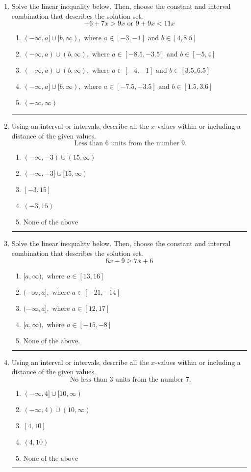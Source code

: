 \documentclass[14pt]{extbook}
\newcommand{\litem}[1]{\item#1\hspace*{-1cm}\rule{\textwidth}{0.4pt}}
\begin{document}
\begin{enumerate}
\litem{
Solve the linear inequality below. Then, choose the constant and interval combination that describes the solution set.\[ -6 + 7 x > 9 x \text{ or } 9 + 9 x < 11 x \]\begin{enumerate}[label=\Alph*.]
\item \( (-\infty, a] \cup [b, \infty), \text{ where } a \in [-3, -1] \text{ and } b \in [4, 8.5] \)
\item \( (-\infty, a) \cup (b, \infty), \text{ where } a \in [-8.5, -3.5] \text{ and } b \in [-5, 4] \)
\item \( (-\infty, a) \cup (b, \infty), \text{ where } a \in [-4, -1] \text{ and } b \in [3.5, 6.5] \)
\item \( (-\infty, a] \cup [b, \infty), \text{ where } a \in [-7.5, -3.5] \text{ and } b \in [1.5, 3.6] \)
\item \( (-\infty, \infty) \)

\end{enumerate} }
\litem{
Using an interval or intervals, describe all the $x$-values within or including a distance of the given values.\[ \text{ Less than } 6 \text{ units from the number } 9. \]\begin{enumerate}[label=\Alph*.]
\item \( (-\infty, -3) \cup (15, \infty) \)
\item \( (-\infty, -3] \cup [15, \infty) \)
\item \( [-3, 15] \)
\item \( (-3, 15) \)
\item \( \text{None of the above} \)

\end{enumerate} }
\litem{
Solve the linear inequality below. Then, choose the constant and interval combination that describes the solution set.\[ 6x -9 \geq 7x + 6 \]\begin{enumerate}[label=\Alph*.]
\item \( [a, \infty), \text{ where } a \in [13, 16] \)
\item \( (-\infty, a], \text{ where } a \in [-21, -14] \)
\item \( (-\infty, a], \text{ where } a \in [12, 17] \)
\item \( [a, \infty), \text{ where } a \in [-15, -8] \)
\item \( \text{None of the above}. \)

\end{enumerate} }
\litem{
Using an interval or intervals, describe all the $x$-values within or including a distance of the given values.\[ \text{ No less than } 3 \text{ units from the number } 7. \]\begin{enumerate}[label=\Alph*.]
\item \( (-\infty, 4] \cup [10, \infty) \)
\item \( (-\infty, 4) \cup (10, \infty) \)
\item \( [4, 10] \)
\item \( (4, 10) \)
\item \( \text{None of the above} \)


\end{enumerate}}
\end{enumerate}
\end{document}
